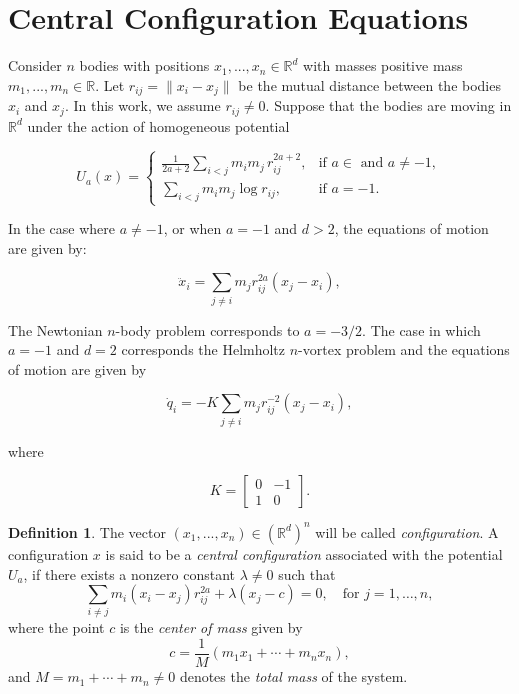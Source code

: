 \documentclass{amsart}
\theoremstyle{definition}
\newtheorem{definition}[theorem]{Definition}
\theoremstyle{remark}
\numberwithin{equation}{section}
\begin{document}
\section{Central Configuration Equations}\label{sec:config}




Consider $n$ bodies with positions $x_1,...,x_n \in \mathbb{R}^d$  with masses positive mass $m_1,...,m_n \in \mathbb{R}$. Let $r_{ij}=\|x_i - x_j\|$ be the mutual distance between the bodies $x_i$ and $x_j$. In this work, we assume $r_{ij} \neq 0$. Suppose that the bodies are moving in $\mathbb{R}^{d}$ under the action of homogeneous potential


$$ U_a(x) = 
\begin{cases}
\displaystyle \frac{1}{2a + 2} \sum_{i < j} m_i m_j \, r_{ij}^{2a + 2}, & \text{if } a \in  \text{ and } a \ne -1, \\
\displaystyle \sum_{i < j} m_i m_j \log r_{ij}, & \text{if } a = -1.
\end{cases}
$$




In the case where \( a \neq -1 \), or when \( a = -1 \) and  \( d > 2 \), the equations of motion are given by:

\begin{equation}\label{eqcc}
  \ddot{x}_{i}= \sum_{j\neq i} m_j r_{ij}^{2a}(x_j - x_i), 
\end{equation}

The Newtonian $n$-body problem corresponds to $a=-3/2.$ The case in which $a=-1$ and $d=2$ corresponds the Helmholtz $n$-vortex problem and the equations of motion are given by

\[
\dot{q}_i = -K \sum_{j \ne i} m_j r_{ij}^{-2}(x_j - x_i),
\]

where 

\begin{equation*}
K = 
\begin{bmatrix}
0 & -1 \\
1 & 0
\end{bmatrix}.
\end{equation*}

 

\begin{definition}\label{defcc}
The vector $(x_1,...,x_n) \in (\mathbb{R}^{d})^n$ will be called \emph{configuration}. A configuration $x$ is said to be a \emph{central configuration} associated  with  the potential $U_a$, if there exists a nonzero constant $\lambda \ne 0$ such that
\begin{equation}
\sum_{i \ne j} m_i (x_i - x_j) r_{ij}^{2a} + \lambda(x_j - c) = 0, \quad \text{for } j = 1, \dots, n,
\end{equation}
where the point $c$ is the \emph{center of mass} given by
\[
c = \frac{1}{M}(m_1 x_1 + \cdots + m_n x_n),  
\]
and $M= m_1 + \cdots + m_n \ne 0$ denotes the \emph{total mass} of the system.
\end{definition}
\end{document}
